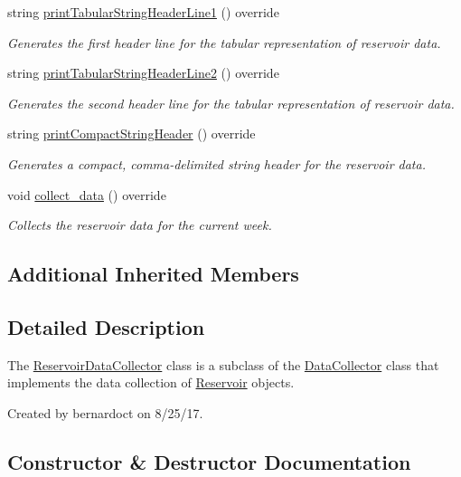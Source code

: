 \begin{DoxyCompactItemize}
string \mbox{\hyperlink{classReservoirDataCollector_a62e7c7abc34c8154b338dfbd284ed665}{print\+Tabular\+String\+Header\+Line1}} () override
\begin{DoxyCompactList}\small\item\em Generates the first header line for the tabular representation of reservoir data. \end{DoxyCompactList}\item 
string \mbox{\hyperlink{classReservoirDataCollector_ae2f8e808c5960608e510a64c7f00ad1b}{print\+Tabular\+String\+Header\+Line2}} () override
\begin{DoxyCompactList}\small\item\em Generates the second header line for the tabular representation of reservoir data. \end{DoxyCompactList}\item 
string \mbox{\hyperlink{classReservoirDataCollector_aa8346433f037bbca41f3c8450f7f88cf}{print\+Compact\+String\+Header}} () override
\begin{DoxyCompactList}\small\item\em Generates a compact, comma-\/delimited string header for the reservoir data. \end{DoxyCompactList}\item 
void \mbox{\hyperlink{classReservoirDataCollector_a5c2e1355c40e45b409168e98245eef95}{collect\+\_\+data}} () override
\begin{DoxyCompactList}\small\item\em Collects the reservoir data for the current week. \end{DoxyCompactList}\end{DoxyCompactItemize}
\subsection*{Additional Inherited Members}


\subsection{Detailed Description}
The {\ttfamily \mbox{\hyperlink{classReservoirDataCollector}{Reservoir\+Data\+Collector}}} class is a subclass of the {\ttfamily \mbox{\hyperlink{classDataCollector}{Data\+Collector}}} class that implements the data collection of \mbox{\hyperlink{classReservoir}{Reservoir}} objects. 

Created by bernardoct on 8/25/17. 

\subsection{Constructor \& Destructor Documentation}
\mbox{\label{classReservoirDataCollector_a7647adce7b2d7a8598ae678a5015dde5}} 
